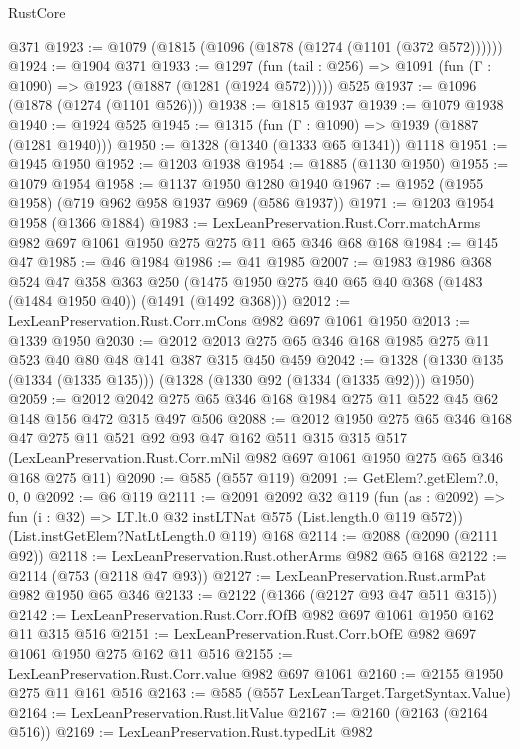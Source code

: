 \begin{lexlean}{RustCore}
\begin{coremodule}
    @371
@1923 := @1079 (@1815 (@1096 (@1878 (@1274 (@1101 (@372 @572))))))
@1924 := @1904 @371
@1933 := @1297
    (fun (tail : @256) => @1091 (fun (Γ : @1090) => @1923 (@1887 (@1281 (@1924 @572)))))
    @525
@1937 := @1096 (@1878 (@1274 (@1101 @526)))
@1938 := @1815 @1937
@1939 := @1079 @1938
@1940 := @1924 @525
@1945 := @1315 (fun (Γ : @1090) => @1939 (@1887 (@1281 @1940)))
@1950 := @1328 (@1340 (@1333 @65 @1341)) @1118
@1951 := @1945 @1950
@1952 := @1203 @1938
@1954 := @1885 (@1130 @1950)
@1955 := @1079 @1954
@1958 := @1137 @1950 @1280 @1940
@1967 := @1952 (@1955 @1958) (@719 @962 @958 @1937 @969 (@586 @1937))
@1971 := @1203 @1954 @1958 (@1366 @1884)
@1983 := LexLeanPreservation.Rust.Corr.matchArms
    @982
    @697
    @1061
    @1950
    @275
    @275
    @11
    @65
    @346
    @68
    @168
@1984 := @145 @47
@1985 := @46 @1984
@1986 := @41 @1985
@2007 := @1983
    @1986
    @368
    @524
    @47
    @358
    @363
    @250
    (@1475 @1950 @275 @40 @65 @40 @368 (@1483 (@1484 @1950 @40)) (@1491 (@1492 @368)))
@2012 := LexLeanPreservation.Rust.Corr.mCons @982 @697 @1061 @1950
@2013 := @1339 @1950
@2030 := @2012 @2013 @275 @65 @346 @168 @1985 @275 @11 @523 @40 @80 @48 @141 @387 @315 @450 @459
@2042 := @1328 (@1330 @135 (@1334 (@1335 @135))) (@1328 (@1330 @92 (@1334 (@1335 @92))) @1950)
@2059 := @2012 @2042 @275 @65 @346 @168 @1984 @275 @11 @522 @45 @62 @148 @156 @472 @315 @497 @506
@2088 := @2012
    @1950
    @275
    @65
    @346
    @168
    @47
    @275
    @11
    @521
    @92
    @93
    @47
    @162
    @511
    @315
    @315
    @517
    (LexLeanPreservation.Rust.Corr.mNil @982 @697 @1061 @1950 @275 @65 @346 @168 @275 @11)
@2090 := @585 (@557 @119)
@2091 := GetElem?.getElem?.{0, 0, 0}
@2092 := @6 @119
@2111 := @2091
    @2092
    @32
    @119
    (fun (as : @2092) => fun (i : @32) => LT.lt.{0} @32 instLTNat @575 (List.length.{0} @119 @572))
    (List.instGetElem?NatLtLength.{0} @119)
    @168
@2114 := @2088 (@2090 (@2111 @92))
@2118 := LexLeanPreservation.Rust.otherArms @982 @65 @168
@2122 := @2114 (@753 (@2118 @47 @93))
@2127 := LexLeanPreservation.Rust.armPat @982 @1950 @65 @346
@2133 := @2122 (@1366 (@2127 @93 @47 @511 @315))
@2142 := LexLeanPreservation.Rust.Corr.fOfB @982 @697 @1061 @1950 @162 @11 @315 @516
@2151 := LexLeanPreservation.Rust.Corr.bOfE @982 @697 @1061 @1950 @275 @162 @11 @516
@2155 := LexLeanPreservation.Rust.Corr.value @982 @697 @1061
@2160 := @2155 @1950 @275 @11 @161 @516
@2163 := @585 (@557 LexLeanTarget.TargetSyntax.Value)
@2164 := LexLeanPreservation.Rust.litValue
@2167 := @2160 (@2163 (@2164 @516))
@2169 := LexLeanPreservation.Rust.typedLit @982

\end{coremodule}
\end{lexlean}
